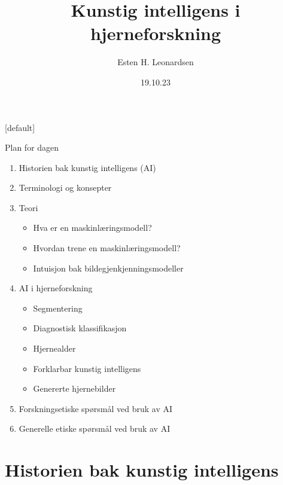 \documentclass[8pt]{beamer}
\date{19.10.23}
\title{Kunstig intelligens i hjerneforskning}
\author{Esten H. Leonardsen}
\begin{document}
  	[default]

	\begin{frame}
		\maketitle
	\end{frame}

	\begin{frame}{Plan for dagen}
		\begin{enumerate}
			\item Historien bak kunstig intelligens (AI)
			\item Terminologi og konsepter
			\item Teori
			\begin{itemize}
				\item Hva er en maskinlæringsmodell?
				\item Hvordan trene en maskinlæringsmodell?
				\item Intuisjon bak bildegjenkjenningsmodeller
			\end{itemize}
			\item AI i hjerneforskning
			\begin{itemize}
				\item Segmentering
				\item Diagnostisk klassifikasjon
				\item Hjernealder
				\item Forklarbar kunstig intelligens
				\item Genererte hjernebilder
			\end{itemize}
			\item Forskningsetiske spørsmål ved bruk av AI
			\item Generelle etiske spørsmål ved bruk av AI
		\end{enumerate}
	\end{frame}


	\section{Historien bak kunstig intelligens}
\end{document}
